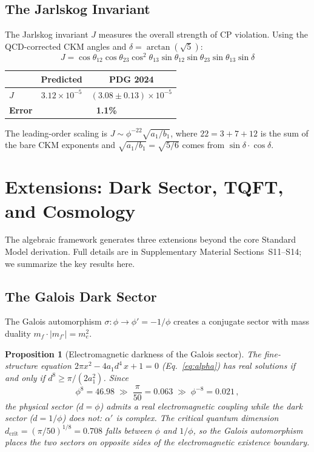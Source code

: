 \documentclass[12pt,a4paper]{article}
\newtheorem{proposition}{Proposition}
\theoremstyle{definition}
\begin{document}
\subsection{The Jarlskog Invariant}

The Jarlskog invariant $J$ measures the overall strength of CP violation. Using the QCD-corrected CKM angles and $\delta = \arctan(\sqrt{5})$:
\begin{equation}
J = \cos\theta_{12}\cos\theta_{23}\cos^2\theta_{13}\sin\theta_{12}\sin\theta_{23}\sin\theta_{13}\sin\delta
\end{equation}
\begin{center}
\begin{tabular}{lcc}
\toprule
& \textbf{Predicted} & \textbf{PDG 2024} \\
\midrule
$J$ & $3.12 \times 10^{-5}$ & $(3.08 \pm 0.13) \times 10^{-5}$ \\
\textbf{Error} & \multicolumn{2}{c}{\textbf{1.1\%}} \\
\bottomrule
\end{tabular}
\end{center}
The leading-order scaling is $J \sim \phi^{-22} \sqrt{a_1/b_1}$, where $22 = 3 + 7 + 12$ is the sum of the bare CKM exponents and $\sqrt{a_1/b_1} = \sqrt{5/6}$ comes from $\sin\delta \cdot \cos\delta$.


\section{Extensions: Dark Sector, TQFT, and Cosmology}
\label{sec:extensions}

The algebraic framework generates three extensions beyond the core Standard Model derivation.  Full details are in Supplementary Material Sections~S11--S14; we summarize the key results here.

\subsection{The Galois Dark Sector}
\label{sec:dark}

The Galois automorphism $\sigma: \phi \to \phi' = -1/\phi$ creates a conjugate sector with mass duality $m_f \cdot |m_{f'}| = m_e^2$.

\begin{proposition}[Electromagnetic darkness of the Galois sector]
\label{prop:dark_alpha}
The fine-structure equation $2\pi x^2 - 4a_1 d^4\, x + 1 = 0$ (Eq.~\ref{eq:alpha}) has real solutions if and only if $d^8 \geq \pi/(2a_1^2)$.  Since
\[
\phi^8 = 46.98 \;\gg\; \frac{\pi}{50} = 0.063 \;\gg\; \phi^{-8} = 0.021\,,
\]
the physical sector ($d = \phi$) admits a real electromagnetic coupling while the dark sector ($d = 1/\phi$) does not: $\alpha'$ is complex.  The critical quantum dimension $d_{\mathrm{crit}} = (\pi/50)^{1/8} = 0.708$ falls between $\phi$ and $1/\phi$, so the Galois automorphism places the two sectors on opposite sides of the electromagnetic existence boundary.
\end{proposition}
\end{document}
